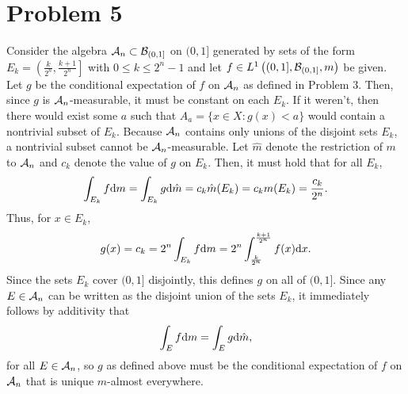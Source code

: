 \documentclass{article}
\begin{document}
\section{Problem 5}
Consider the algebra ${\cal A}_n\subset{\cal B}_{(0,1]}$ on $(0,1]$ generated by sets of the form $E_k=\left(\frac{k}{2^n},\frac{k+1}{2^n}\right]$ with $0\leq k\leq2^n-1$ and let $f\in L^1\left((0,1],{\cal B}_{(0,1]},m\right)$ be given. Let $g$ be the conditional expectation of $f$ on ${\cal A}_n$ as defined in Problem 3. Then, since $g$ is ${\cal A}_n$-measurable, it must be constant on each $E_k$. If it weren't, then there would exist some $a$ such that $A_a=\{x\in X:g(x)<a\}$ would contain a nontrivial subset of $E_k$. Because ${\cal A}_n$ contains only unions of the disjoint sets $E_k$, a nontrivial subset cannot be ${\cal A}_n$-measurable. Let $\hat m$ denote the restriction of $m$ to ${\cal A}_n$ and $c_k$ denote the value of $g$ on $E_k$. Then, it must hold that for all $E_k$,
\[
\int_{E_k}f\mathrm{d} m=\int_{E_k}g\mathrm{d} \hat m=c_k\hat m(E_k)=c_km(E_k)=\frac{c_k}{2^n}.
\]
Thus, for $x\in E_k$, 
\[
g(x)=c_k=2^n\int_{E_k}f\mathrm{d} m=2^n\int_{\frac{k}{2^n}}^{\frac{k+1}{2^n}}f(x)\mathrm{d} x.
\]
Since the sets $E_k$ cover $(0,1]$ disjointly, this defines $g$ on all of $(0,1]$. Since any $E\in{\cal A}_n$ can be written as the disjoint union of the sets $E_k$, it immediately follows by additivity that 
\[
\int_{E}f\mathrm{d} m=\int_{E}g\mathrm{d} \hat m,
\]
for all $E\in{\cal A}_n$, so $g$ as defined above must be the conditional expectation of $f$ on ${\cal A}_n$ that is unique $m$-almost everywhere.
\end{document}
